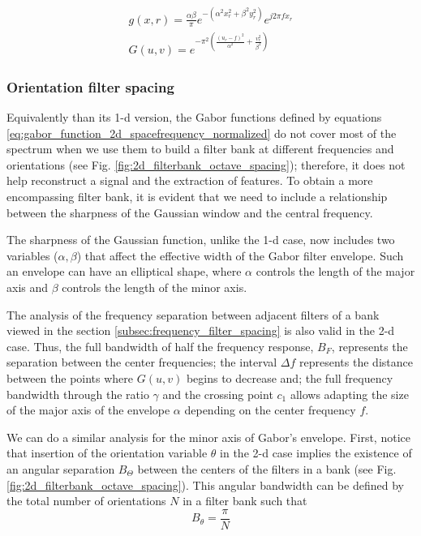 \begin{equation}\label{eq:gabor_function_2d_spacefrequency_normalized}
    \begin{gathered}
        g(x, r) = \frac{\alpha \beta}{\pi} e ^{-\left(\alpha^2 x_r^2 + \beta^2 y_r^2\right)} e ^{j 2 \pi f x_r } \\
        G(u, v) =   e ^{- \pi^2 \left(\frac{\left( u_r - f\right)^2}{\alpha^2} + \frac{v_r^2}{\beta^2}\right)} 
     \end{gathered}
\end{equation}

\subsubsection{Orientation filter spacing}

Equivalently than its 1-d version, the Gabor functions defined by equations \eqref{eq:gabor_function_2d_spacefrequency_normalized} do not cover most of the spectrum when we use them to build a filter bank at different frequencies and orientations (see Fig. \ref{fig:2d_filterbank_octave_spacing}); therefore, it does not help reconstruct a signal and the extraction of features. To obtain a more encompassing filter bank, it is evident that we need to include a relationship between the sharpness of the Gaussian window and the central frequency. 

The sharpness of the Gaussian function, unlike the 1-d case, now includes two variables ($\alpha, \beta$) that affect the effective width of the Gabor filter envelope. Such an envelope can have an elliptical shape, where $\alpha $ controls the length of the major axis and $\beta$ controls the length of the minor axis. 

The analysis of the frequency separation between adjacent filters of a bank viewed in the section \ref{subsec:frequency_filter_spacing} is also valid in the 2-d case. Thus, the full bandwidth of half the frequency response, $B_F$, represents the separation between the center frequencies; the interval $\Delta f$ represents the distance between the points where $G(u, v)$ begins to decrease and; the full frequency bandwidth through the ratio $\gamma$ and the crossing point $c_1$ allows adapting the size of the major axis of the envelope $\alpha$ depending on the center frequency $f$.

We can do a similar analysis for the minor axis of Gabor's envelope. First, notice that insertion of the orientation variable $\theta$ in the 2-d case implies the existence of an angular separation $B_{\Theta}$ between the centers of the filters in a bank (see Fig. \ref{fig:2d_filterbank_octave_spacing}). This angular bandwidth can be defined by the total number of orientations $N$ in a filter bank such that
\begin{equation}\label{eq:angular_bandwidth}
    B_{\theta} = \frac{\pi}{N}
\end{equation}


